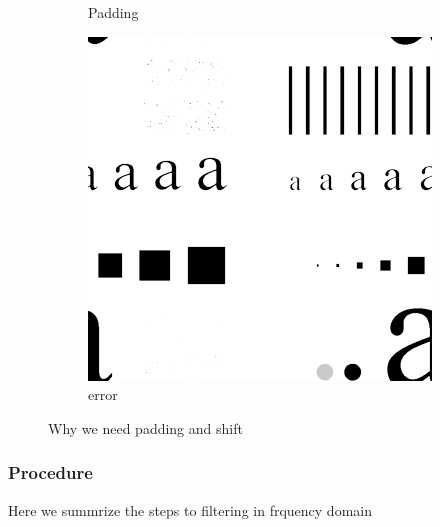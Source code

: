 \documentclass[
	12pt, %
]{style/fphw}
\begin{document}
\begin{figure}[H]
\begin{subfigure}[b]{0.2\textwidth}
         \caption{Padding}
         \label{padding.png}
     \end{subfigure}
     \hfill
     \begin{subfigure}[b]{0.2\textwidth}
         \centering
         \includegraphics[width=\textwidth]{plots/warpped.png}
         \caption{error}
         \label{wraparound error}
     \end{subfigure}
        \caption{Why we need padding and shift}
        \label{padding}
\end{figure}

\subsubsection*{Procedure}
Here we summrize the steps to filtering in frquency domain
\end{document}
